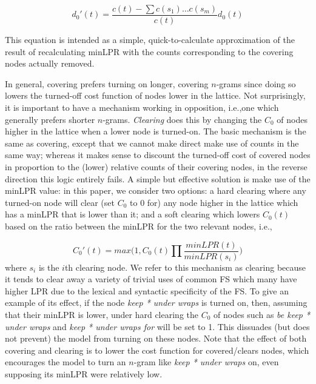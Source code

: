\documentclass[11pt]{article}
\makeatletter
\def \ie {i.e.,\@ }
\makeatother
\begin{document}
\begin{displaymath}
d_{0}'(t) = \frac{c(t) - \sum{c(s_1)\ldots c(s_m)}}{c(t)} d_0(t)

\end{displaymath}

\noindent
This equation is intended as a simple, quick-to-calculate approximation of the result of recalculating minLPR with the counts corresponding to the covering nodes actually removed.

In general, covering prefers turning on longer, covering $n$-grams since doing so lowers the turned-off cost function of nodes lower in the lattice. Not surprisingly, it is important to have a mechanism working in opposition, \ie one which generally prefers shorter $n$-grams. \textit{Clearing} does this by changing the $C_0$ of nodes higher in the lattice when a lower node is turned-on. The basic mechanism is the same as covering, except that we cannot make direct make use of counts in the same way; whereas it makes sense to discount the turned-off cost of covered nodes in proportion to the (lower) relative counts of their covering nodes, in the reverse direction this logic entirely fails. A simple but effective solution is make use of the minLPR value: in this paper, we consider two options: a hard clearing where any turned-on node will clear (set $C_{0}$ to 0 for) any node higher in the lattice which has a minLPR that is lower than it; and a soft clearing which lowers  $C_{0}(t)$ based on the ratio between the minLPR for the two relevant nodes, \ie

\begin{displaymath}
C_{0}'(t) = max(1, C_{0}(t) \prod{\frac{minLPR(t)}{minLPR(s_i)})}

\end{displaymath}
\noindent
where $s_i$ is the $i$th clearing node. We refer to this mechanism as clearing because it tends to clear away a variety of trivial uses of common FS which many have higher LPR due to the lexical and syntactic specificity of the FS. To give an example of its effect, if the node \emph{keep * under wraps} is turned on, then, assuming that their minLPR is lower, under hard clearing the $C_0$ of nodes such as \emph{be keep * under wraps} and \emph{keep * under wraps for} will be set to 1. This dissuades (but does not prevent) the model from turning on these nodes. Note that the effect of both covering and clearing is to lower the cost function for covered/clears nodes, which encourages the model to turn an $n$-gram like \emph{keep * under wraps} on, even supposing its minLPR were relatively low.
\end{document}
